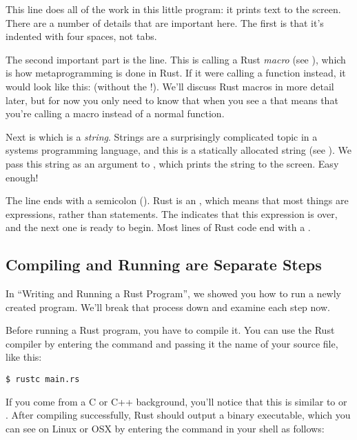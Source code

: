 This line does all of the work in this little program: it prints text to the screen. There are a number of details that are important 
here. The first is that it's indented with four spaces, not tabs.

\blank

The second important part is the  line. This is calling a Rust \emph{macro} (see ), which 
is how metaprogramming is done in Rust. If it were calling a function instead, it would look like this:  (without the !). 
We'll discuss Rust macros in more detail later, but for now you only need to know that when you see a \code{!} that means that you're 
calling a macro instead of a normal function.

\blank

Next is  which is a \emph{string}. Strings are a surprisingly complicated topic in a systems programming 
language, and this is a statically allocated string (see ). We pass this string as an argument 
to , which prints the string to the screen. Easy enough!

\blank

The line ends with a semicolon (\code{;}). Rust is an , which means that most things are 
expressions, rather than statements. The \code{;} indicates that this expression is over, and the next one is ready 
to begin. Most lines of Rust code end with a \code{;}.

\subsection*{Compiling and Running are Separate Steps}

In \enquote{Writing and Running a Rust Program}, we showed you how to run a newly created program. We'll break that process 
down and examine each step now.

\blank

Before running a Rust program, you have to compile it. You can use the Rust compiler by entering the 
 command and passing it the name of your source file, like this:

\begin{verbatim}
$ rustc main.rs
\end{verbatim}

If you come from a C or C++ background, you'll notice that this is similar to  or . After 
compiling successfully, Rust should output a binary executable, which you can see on Linux or OSX by entering the 
 command in your shell as follows:

